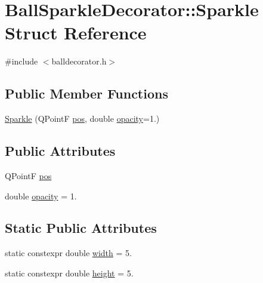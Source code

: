 \hypertarget{struct_ball_sparkle_decorator_1_1_sparkle}{}\section{Ball\+Sparkle\+Decorator\+:\+:Sparkle Struct Reference}
\label{struct_ball_sparkle_decorator_1_1_sparkle}


{\ttfamily \#include $<$balldecorator.\+h$>$}

\subsection*{Public Member Functions}
\begin{DoxyCompactItemize}
\item 
\mbox{\hyperlink{struct_ball_sparkle_decorator_1_1_sparkle_a3c722e501faf223889464bd622375c11}{Sparkle}} (Q\+PointF \mbox{\hyperlink{struct_ball_sparkle_decorator_1_1_sparkle_aeb4b735006a31fa11fa78394a4848236}{pos}}, double \mbox{\hyperlink{struct_ball_sparkle_decorator_1_1_sparkle_a44963032a6ce95c5b552d4c5159f88c2}{opacity}}=1.)
\end{DoxyCompactItemize}
\subsection*{Public Attributes}
\begin{DoxyCompactItemize}
\item 
Q\+PointF \mbox{\hyperlink{struct_ball_sparkle_decorator_1_1_sparkle_aeb4b735006a31fa11fa78394a4848236}{pos}}
\item 
double \mbox{\hyperlink{struct_ball_sparkle_decorator_1_1_sparkle_a44963032a6ce95c5b552d4c5159f88c2}{opacity}} = 1.
\end{DoxyCompactItemize}
\subsection*{Static Public Attributes}
\begin{DoxyCompactItemize}
\item 
static constexpr double \mbox{\hyperlink{struct_ball_sparkle_decorator_1_1_sparkle_a6602f6013f4b6d436cf07a67c9a2b98d}{width}} = 5.
\item 
static constexpr double \mbox{\hyperlink{struct_ball_sparkle_decorator_1_1_sparkle_a3098571dbcb489f4821ac0446ef18d26}{height}} = 5.
\end{DoxyCompactItemize}


